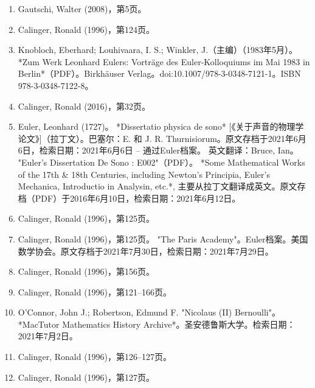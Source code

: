 \begin{enumerate}
\item Gautschi, Walter (2008)，第5页。  
\item Calinger, Ronald (1996)，第124页。  
\item Knobloch, Eberhard; Louhivaara, I. S.; Winkler, J.（主编）（1983年5月）。 *Zum Werk Leonhard Eulers: Vorträge des Euler-Kolloquiums im Mai 1983 in Berlin*（PDF）。Birkhäuser Verlag。doi:10.1007/978-3-0348-7121-1。ISBN 978-3-0348-7122-8。  
\item Calinger, Ronald (2016)，第32页。
\item Euler, Leonhard (1727)。 *Dissertatio physica de sono* [《关于声音的物理学论文》]（拉丁文）。巴塞尔：E. 和 J. R. Thurnisiorum。原文存档于2021年6月6日，检索日期：2021年6月6日 – 通过Euler档案。  
英文翻译：Bruce, Ian。 "Euler's Dissertation De Sono : E002"（PDF）。 *Some Mathematical Works of the 17th & 18th Centuries, including Newton's Principia, Euler's Mechanica, Introductio in Analysin, etc.*, 主要从拉丁文翻译成英文。原文存档（PDF）于2016年6月10日，检索日期：2021年6月12日。  
\item Calinger, Ronald (1996)，第125页。  
\item Calinger, Ronald (1996)，第125页。  
"The Paris Academy"。Euler档案。美国数学协会。原文存档于2021年7月30日，检索日期：2021年7月29日。  
\item Calinger, Ronald (1996)，第156页。  
\item Calinger, Ronald (1996)，第121–166页。  
\item O'Connor, John J.; Robertson, Edmund F. "Nicolaus (II) Bernoulli"。 *MacTutor Mathematics History Archive*。圣安德鲁斯大学。检索日期：2021年7月2日。  
\item Calinger, Ronald (1996)，第126–127页。  
\item Calinger, Ronald (1996)，第127页。
\end{enumerate}